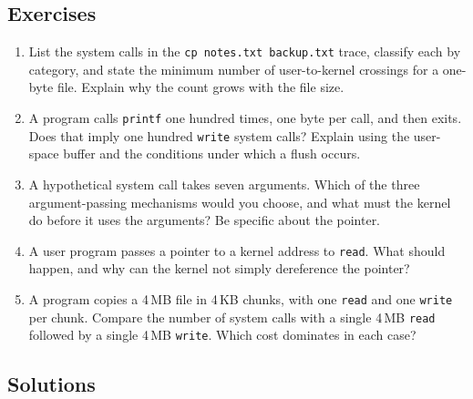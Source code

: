 \documentclass[11pt]{article}
\begin{document}
\subsection*{Exercises}

\begin{enumerate}
  \item List the system calls in the \texttt{cp notes.txt backup.txt} trace,
        classify each by category, and state the minimum number of user-to-kernel
        crossings for a one-byte file. Explain why the count grows with the file
        size.
  \item A program calls \texttt{printf} one hundred times, one byte per call,
        and then exits. Does that imply one hundred \texttt{write} system calls?
        Explain using the user-space buffer and the conditions under which a
        flush occurs.
  \item A hypothetical system call takes seven arguments. Which of the three
        argument-passing mechanisms would you choose, and what must the kernel
        do before it uses the arguments? Be specific about the pointer.
  \item A user program passes a pointer to a kernel address to \texttt{read}.
        What should happen, and why can the kernel not simply dereference the
        pointer?
  \item A program copies a 4\,MB file in 4\,KB chunks, with one \texttt{read}
        and one \texttt{write} per chunk. Compare the number of system calls
        with a single 4\,MB \texttt{read} followed by a single 4\,MB
        \texttt{write}. Which cost dominates in each case?
\end{enumerate}

\subsection*{Solutions}
\end{document}
